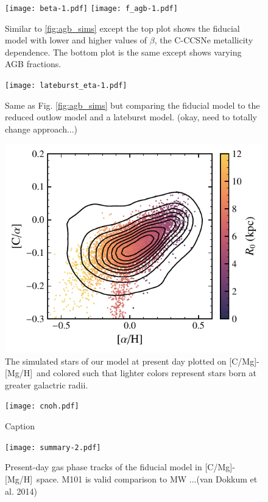 \documentclass[fleqn,usenatbib]{mnras}
\newcommand{\caah}{[C/Mg]-[Mg/H]}
\begin{document}
\begin{figure}\label{fig:beta_f}
\texttt{[image: beta-1.pdf]}
\texttt{[image: f\_agb-1.pdf]}

\caption{Similar to \ref{fig:agb_sims} except the top plot shows the fiducial model with lower and higher values of $\beta$, the C-CCSNe metallicity dependence. The bottom plot is the same except shows varying AGB fractions.}
\end{figure}

\begin{figure}
\texttt{[image: lateburst\_eta-1.pdf]}

\caption{Same as Fig. \ref{fig:agb_sims} but comparing the fiducial model to the reduced outlow model and a lateburst model. (okay, need to totally change approach...)}
\end{figure}


\begin{figure}
    \includegraphics[scale=0.6]{cooh_scatter.pdf}
    \caption{The simulated stars of our model at present day plotted on \caah~and colored such that lighter colors represent stars born at greater galactric radii.}
\end{figure}

\begin{figure}
    \centering
    \texttt{[image: cnoh.pdf]}
    \caption{Caption}
    \label{fig:cnofe}
\end{figure}


\begin{figure}
\centering
\texttt{[image: summary-2.pdf]}
\caption{Present-day gas phase tracks of the fiducial model in \caah~space. M101 is valid comparison to MW ...(van Dokkum et al. 2014)}
\label{fig:gas_phase}
\end{figure}
\end{document}
